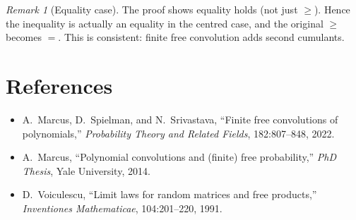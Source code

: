 \documentclass[12pt]{article}
\theoremstyle{definition}
\theoremstyle{remark}
\newtheorem{remark}[theorem]{Remark}
\begin{document}
\begin{remark}[Equality case]
The proof shows equality holds (not just $\ge$).  Hence the inequality is
actually an equality in the centred case, and the original $\ge$ becomes $=$.
This is consistent: finite free convolution adds second cumulants.
\end{remark}

\section*{References}

\begin{itemize}
\item A.~Marcus, D.~Spielman, and N.~Srivastava, ``Finite free convolutions of
  polynomials,'' \emph{Probability Theory and Related Fields}, 182:807--848,
  2022.
\item A.~Marcus, ``Polynomial convolutions and (finite) free probability,''
  \emph{PhD Thesis}, Yale University, 2014.
\item D.~Voiculescu, ``Limit laws for random matrices and free products,''
  \emph{Inventiones Mathematicae}, 104:201--220, 1991.
\end{itemize}
\end{document}
